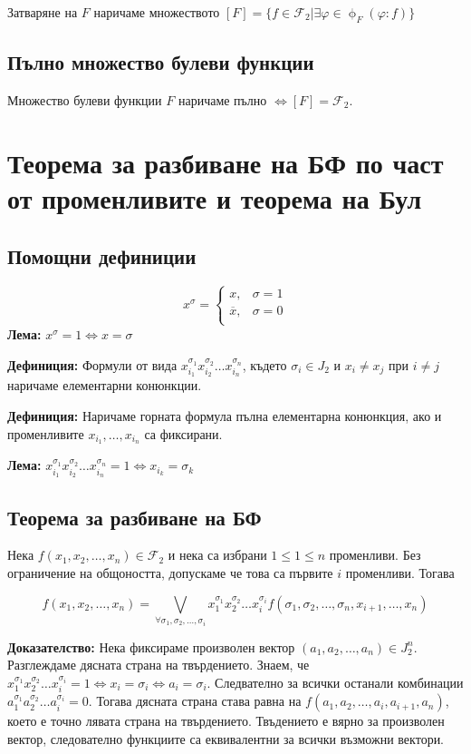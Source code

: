 \documentclass[fleqn,12pt]{article}
\begin{document}
\begin{flushleft}
Затваряне на $F$ наричаме множеството $[F] = \{ f \in \mathcal{F}_2 | \exists \varphi \in \upphi_F (\varphi : f) \}$

\subsection{Пълно множество булеви функции}
Множество булеви функции $F$ наричаме пълно $\Leftrightarrow [F] = \mathcal{F}_2$.

\section{Теорема за разбиване на БФ по част от променливите и теорема на Бул}

\subsection{Помощни дефиниции}
\[ x^\sigma = \begin{cases}
    x, & \sigma = 1 \\
    \overline{x}, & \sigma = 0 \\
\end{cases}\]
\textbf{Лема: } $x^\sigma = 1 \Leftrightarrow x = \sigma$

\textbf{Дефиниция: } Формули от вида $x_{i_1}^{\sigma_1} x_{i_2}^{\sigma_2} \dots x_{i_n}^{\sigma_n}$, където
$\sigma_i \in J_2$ и $x_i \neq x_j$ при $i \neq j$ наричаме елементарни конюнкции.
 
\textbf{Дефиниция: } Наричаме горната формула пълна елементарна конюнкция, ако и променливите $x_{i_1}, \dots, x_{i_n}$ са фиксирани.

\textbf{Лема: } $x_{i_1}^{\sigma_1} x_{i_2}^{\sigma_2} \dots x_{i_n}^{\sigma_n} = 1 \Leftrightarrow x_{i_k} = \sigma_k$

\subsection{Теорема за разбиване на БФ}
Нека $f(x_1, x_2, \dots, x_n) \in \mathcal{F}_2$ и нека са избрани $1 \leq 1 \leq n$ променливи.
Без ограничение на общоността, допускаме че това са първите $i$ променливи. Тогава

\[ f(x_1, x_2, \dots, x_n) = \bigvee_{\forall \sigma_1, \sigma_2, \dots, \sigma_i} x_1^{\sigma_1} x_2^{\sigma_2} \dots x_i^{\sigma_i} f(\sigma_1, \sigma_2, \dots, \sigma_n, x_{i+1}, \dots, x_n) \]

\textbf{Доказателство: } Нека фиксираме произволен вектор $(a_1, a_2, \dots, a_n) \in J_2^n$.
Разглеждаме дясната страна на твърдението. Знаем, че 
$x_1^{\sigma_1} x_2^{\sigma_2} \dots x_i^{\sigma_i} = 1 \Leftrightarrow x_i = \sigma_i \Leftrightarrow a_i = \sigma_i$.
Следвателно за всички останали комбинации $a_1^{\sigma_1} a_2^{\sigma_2} \dots a_i^{\sigma_i} = 0$. Тогава дясната страна става равна на 
$f(a_1, a_2, \dots, a_i, a_{i+1}, a_n)$, което е точно лявата страна на твърдението. Твъдението е вярно за произволен вектор, следователно
функциите са еквивалентни за всички възможни вектори.


\end{flushleft}
\end{document}
